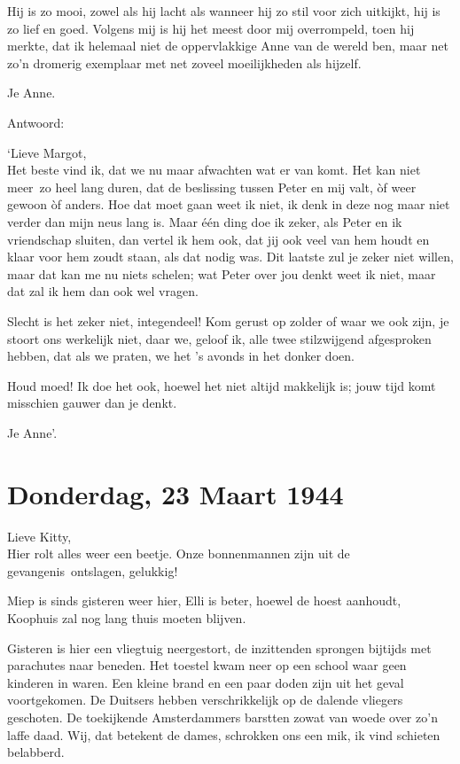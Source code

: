 \documentclass{book}
\begin{document}
Hij is zo mooi, zowel als hij lacht als wanneer hij zo stil voor zich uitkijkt,
hij is zo lief en goed. Volgens mij is hij het meest door mij overrompeld, toen
hij merkte, dat ik helemaal niet de oppervlakkige Anne van de wereld ben, maar
net zo'n dromerig exemplaar met net zoveel moeilijkheden als hijzelf.

Je Anne.

Antwoord:

`Lieve Margot,\\
Het beste vind ik, dat we nu maar afwachten wat er van komt.
Het kan niet meer~zo heel lang duren, dat de beslissing tussen Peter en mij
valt, òf weer gewoon òf anders. Hoe dat moet gaan weet ik niet, ik denk in deze
nog maar niet verder dan mijn neus lang is. Maar één ding doe ik zeker, als
Peter en ik vriendschap sluiten, dan vertel ik hem ook, dat jij ook veel van hem
houdt en klaar voor hem zoudt staan, als dat nodig was. Dit laatste zul je zeker
niet willen, maar dat kan me nu niets schelen; wat Peter over jou denkt weet ik
niet, maar dat zal ik hem dan ook wel vragen.

Slecht is het zeker niet, integendeel! Kom gerust op zolder of waar we ook zijn,
je stoort ons werkelijk niet, daar we, geloof ik, alle twee stilzwijgend
afgesproken hebben, dat als we praten, we het 's avonds in het donker doen.

Houd moed! Ik doe het ook, hoewel het niet altijd makkelijk is; jouw tijd komt
misschien gauwer dan je denkt.

Je Anne'.

\section*{Donderdag, 23 Maart 1944}

Lieve Kitty,\\
Hier rolt alles weer een beetje. Onze bonnenmannen zijn uit de
gevangenis~ontslagen, gelukkig!

Miep is sinds gisteren weer hier, Elli is beter, hoewel de hoest aanhoudt,
Koophuis zal nog lang thuis moeten blijven.

Gisteren is hier een vliegtuig neergestort, de inzittenden sprongen bijtijds met
parachutes naar beneden. Het toestel kwam neer op een school waar geen kinderen
in waren. Een kleine brand en een paar doden zijn uit het geval voortgekomen. De
Duitsers hebben verschrikkelijk op de dalende vliegers geschoten. De toekijkende
Amsterdammers barstten zowat van woede over zo'n laffe daad. Wij, dat betekent
de dames, schrokken ons een mik, ik vind schieten belabberd.
\end{document}
